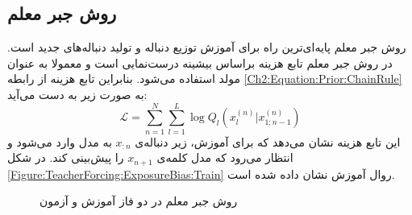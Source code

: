  \subsection{روش  جبر معلم}\label{sec2:exposurebias}
  \label{Method:TeacherForcing}
 روش جبر معلم پایه‌ای‌ترین راه برای آموزش توزیع دنباله و تولید دنباله‌های جدید است.
 در روش  جبر معلم تابع هزینه‌ براساس بیشینه درست‌نمایی است و  معمولا 
 به عنوان مولد استفاده می‌شود. بنابراین تابع هزینه از رابطه‌
\ref{Ch2:Equation:Prior:ChainRule}
به صورت زیر  به دست می‌آید:
\begin{equation}
\mathcal{L} = \sum_{n=1}^N \sum_{l=1}^{L} \log Q_l(x_l^{(n)}|x_{1:n-1}^{(n)})
\end{equation}
این  تابع هزینه نشان می‌دهد که برای آموزش،  زیر دنباله‌ی 
$x_{:n}$
به مدل وارد می‌شود و انتظار می‌رود که مدل کلمه‌ی 
$x_{n+1}$
را پیش‌بینی کند. در شکل
\ref{Figure:TeacherForcing:ExposureBias:Train}
روال آموزش نشان داده شده است.
 \begin{figure}[!htb]
 	{
 		\begin{center}
 			\hspace{1cm}
 		\end{center}
 		\caption[روش  جبر معلم در دو فاز آموزش و آزمون]
 		{روش  جبر معلم در دو فاز آموزش و آزمون \cite{lamb2016professor}}
 		\label{Figure:TeacherForcing:ExposureBias}
 	}
 \end{figure}
